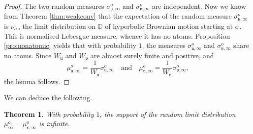 \documentclass[12pt]{amsart}
\newcommand\AND{\quad\text{and}\quad}
\newcommand\bep{\boldsymbol{\epsilon}}
\newcommand\DD{\mathbb D}
\newcommand\Laa{\sigma}
\newcommand\ut{\mathfrak{u}}
\newcommand\vt{\mathfrak{v}}
\newtheorem{theorem}{Theorem}%
\numberwithin{theorem}{section}
\theoremstyle{definition}
\begin{document}
\begin{proof} The two random measures $\Laa_{\ut, \infty}^{o}$ and $\Laa_{\vt, \infty}^{o}$ 
are independent. 
Now we know from Theorem \ref{thm:weakconv} that the expectation
of the random measure $\Laa_{\ut, \infty}^{o}$ is $\nu_o\,$,
the limit distribution on $\DD$ of hyperbolic Brownian motion starting at $o\,$.
This is normalised Lebesgue measure, whence it has no atoms. Proposition 
\ref{pro:nonatomic} yields that with probability $1$, the measures 
$\Laa_{\ut, \infty}^{o}$ and $\Laa_{\vt, \infty}^{o}$ share no atoms.
Since $W_{\ut}$ and $W_{\vt}$ are almost surely finite and positive, 
and 
$$
\mu_{\ut, \infty}^{o} = \frac{1}{W_{\ut}} \Laa_{\ut, \infty}^{o} 
\AND 
\mu_{\vt, \infty}^{o} = \frac{1}{W_{\vt}} \Laa_{\vt, \infty}^{o},
$$
the lemma follows.
\end{proof}

We can deduce the following.

\begin{theorem}\label{thm:atoms}
With probability $1$, the support of the random limit distribution 
$\mu_{\infty}^{o} = \mu_{\bep, \infty}^{o}$
is infinite.
\end{theorem}
\end{document}
